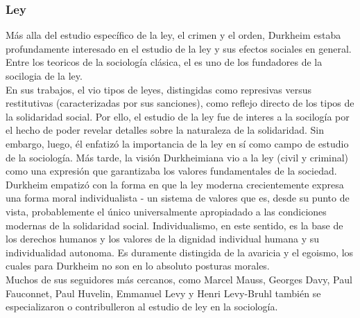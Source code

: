 \subsubsection{Ley}
M\'as alla del estudio espec\'ifico de la ley, el crimen y el orden, Durkheim estaba profundamente interesado en el estudio de la ley y sus efectos sociales en general.
Entre los teoricos de la sociolog\'ia cl\'asica, el es uno de los fundadores de la socilogia de la ley.\\
En sus trabajos, el vio tipos de leyes, distingidas como represivas versus restitutivas (caracterizadas por sus sanciones), como reflejo directo de los tipos de la solidaridad social.
Por ello, el estudio de la ley fue de interes a la socilog\'ia por el hecho de poder revelar detalles sobre la naturaleza de la solidaridad.
Sin embargo, luego, \'el enfatiz\'o la importancia de la ley en s\'i como campo de estudio de la sociolog\'ia.
M\'as tarde, la visi\'on Durkheimiana vio a la ley (civil y criminal) como una expresi\'on que garantizaba los valores fundamentales de la sociedad.
Durkheim empatiz\'o con la forma en que la ley moderna crecientemente expresa una forma moral individualista - un sistema de valores que es, desde su punto de vista, probablemente el \'unico universalmente apropiadado a las condiciones modernas de la solidaridad social.
Individualismo, en este sentido, es la base de los derechos humanos y los valores de la dignidad individual humana y su individualidad autonoma.
Es duramente distingida de la avaricia y el egoismo, los cuales para Durkheim no son en lo absoluto posturas morales.\\
Muchos de sus seguidores m\'as cercanos, como Marcel Mauss, Georges Davy, Paul Fauconnet, Paul Huvelin, Emmanuel Levy y Henri Levy-Bruhl tambi\'en se especializaron o contribulleron al estudio de ley en la sociolog\'ia.

